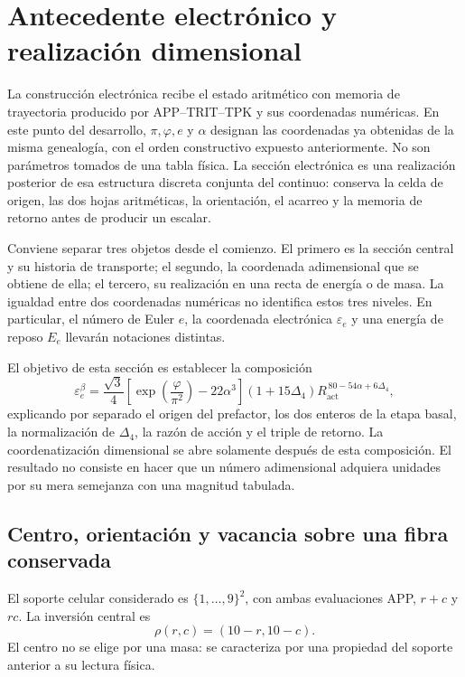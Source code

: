\section{Antecedente electrónico y realización dimensional}
\label{sec:electron}

La construcción electrónica recibe el estado aritmético con memoria de
trayectoria producido por APP--TRIT--TPK y sus coordenadas numéricas. En este punto del desarrollo,
\(\pi,\varphi,e\) y \(\alpha\) designan las coordenadas ya obtenidas de
la misma genealogía, con el orden constructivo expuesto anteriormente. No
son parámetros tomados de una tabla física. La sección electrónica es una
realización posterior de esa estructura discreta conjunta del continuo:
conserva la celda de origen, las dos hojas aritméticas, la orientación, el
acarreo y la memoria de retorno antes de producir un escalar.

Conviene separar tres objetos desde el comienzo. El primero es la sección
central y su historia de transporte; el segundo, la coordenada
adimensional que se obtiene de ella; el tercero, su realización en una
recta de energía o de masa. La igualdad entre dos coordenadas numéricas no
identifica estos tres niveles. En particular, el número de Euler \(e\),
la coordenada electrónica \(\varepsilon_e\) y una energía de reposo
\(E_e\) llevarán notaciones distintas.

El objetivo de esta sección es establecer la composición
\begin{equation}
 \varepsilon_e^{\beta}
 =\frac{\sqrt3}{4}
  \left[\exp\!\left(\frac{\varphi}{\pi^2}\right)-22\alpha^3\right]
  (1+15\Delta_4)
  R_{\mathrm{act}}^{\,80-54\alpha+6\Delta_4},
 \label{eq:el-formula-completa}
\end{equation}
explicando por separado el origen del prefactor, los dos enteros de la
etapa basal, la normalización de \(\Delta_4\), la razón de acción y el
triple de retorno. La coordenatización dimensional se abre solamente después de
esta composición. El resultado no consiste en hacer que un número
adimensional adquiera unidades por su mera semejanza con una magnitud
tabulada.



\subsection{Centro, orientación y vacancia sobre una fibra conservada}

El soporte celular considerado es \(\{1,\ldots,9\}^2\), con ambas
evaluaciones APP, \(r+c\) y \(rc\). La inversión central es
\begin{equation}
 \rho(r,c)=(10-r,10-c).
 \label{eq:el-inversion-central}
\end{equation}
El centro no se elige por una masa: se caracteriza por una propiedad del
soporte anterior a su lectura física.

